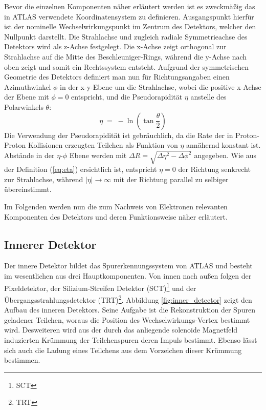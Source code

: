 Bevor die einzelnen Komponenten näher erläutert werden ist es zweckmäßig das in
ATLAS verwendete Koordinatensystem zu definieren. Ausgangspunkt hierfür ist der
nominelle Wechselwirkungspunkt im Zentrum des Detektors, welcher den Nullpunkt
darstellt. Die Strahlachse und zugleich radiale Symmetrieachse des Detektors
wird als z-Achse festgelegt. Die x-Achse zeigt orthogonal zur Strahlachse auf
die Mitte des Beschleuniger-Rings, während die y-Achse nach oben zeigt und
somit ein Rechtssystem entsteht. Aufgrund der symmetrischen Geometrie des
Detektors definiert man nun für Richtungsangaben einen Azimuthwinkel
$\phi$ in der x-y-Ebene um die Strahlachse, wobei die positive x-Achse der
Ebene mit $\phi=0$ entspricht, und die Pseudorapidität $\eta$ anstelle des
Polarwinkels $\theta$:
\begin{equation}
    \eta \; = \; - \ln \left( \tan\frac{\theta}{2} \right)
    \label{eq:eta}
\end{equation}
Die Verwendung der Pseudorapidität ist gebräuchlich, da die Rate der in
Proton-Proton Kollisionen erzeugten Teilchen als Funktion von $\eta$ annähernd
konstant ist. Abstände in der $\eta$-$\phi$ Ebene werden mit
$\Delta R=\sqrt{\Delta\eta^2-\Delta\phi^2}$ angegeben. Wie aus der Definition
(\ref{eq:eta}) ersichtlich ist, entspricht $\eta=0$ der Richtung senkrecht zur
Strahlachse, während $|\eta| \rightarrow \infty$ mit der Richtung parallel zu
selbiger übereinstimmt.

Im Folgenden werden nun die zum Nachweis von Elektronen relevanten Komponenten
des Detektors und deren Funktionsweise näher erläutert.



\subsection{Innerer Detektor}
\label{inner_detector}

Der innere Detektor bildet das Spurerkennungssystem von ATLAS und besteht im
wesentlichen aus drei Hauptkomponenten. Von innen nach außen folgen der
Pixeldetektor, der Silizium-Streifen Detektor (\acs{SCT})\footnote{\acf{SCT}}
und der Übergangsstrahlungsdetektor (\acs{TRT})\footnote{\acf{TRT}}. Abbildung
\ref{fig:inner_detector} zeigt den Aufbau des inneren Detektors. Seine Aufgabe
ist die Rekonstruktion der Spuren geladener Teilchen, woraus die Position des
Wechselwirkungs-Vertex bestimmt wird. Desweiteren wird aus der durch das
anliegende solenoide Magnetfeld induzierten Krümmung der Teilchenspuren deren
Impuls bestimmt. Ebenso lässt sich auch die Ladung eines Teilchens aus dem
Vorzeichen dieser Krümmung bestimmen.

